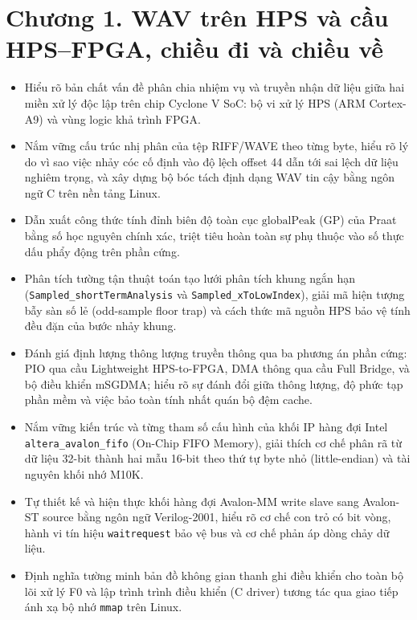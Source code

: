 \providecommand{\todo}[1]{\textcolor{red}{\textbf{[TODO: #1]}}}
\clearpage
{}
\section*{Chương 1. WAV trên HPS và cầu HPS–FPGA, chiều đi và chiều về}

\begin{learningobj}
\begin{itemize}[leftmargin=1.5em, itemsep=2pt]
    \item Hiểu rõ bản chất vấn đề phân chia nhiệm vụ và truyền nhận dữ liệu giữa hai miền xử lý độc lập trên chip Cyclone V SoC: bộ vi xử lý HPS (ARM Cortex-A9) và vùng logic khả trình FPGA.
    \item Nắm vững cấu trúc nhị phân của tệp RIFF/WAVE theo từng byte, hiểu rõ lý do vì sao việc nhảy cóc cố định vào độ lệch offset 44 dẫn tới sai lệch dữ liệu nghiêm trọng, và xây dựng bộ bóc tách định dạng WAV tin cậy bằng ngôn ngữ C trên nền tảng Linux.
    \item Dẫn xuất công thức tính đỉnh biên độ toàn cục $\text{globalPeak}$ (GP) của Praat bằng số học nguyên chính xác, triệt tiêu hoàn toàn sự phụ thuộc vào số thực dấu phẩy động trên phần cứng.
    \item Phân tích tường tận thuật toán tạo lưới phân tích khung ngắn hạn (\texttt{Sampled\_shortTermAnalysis} và \texttt{Sampled\_xToLowIndex}), giải mã hiện tượng bẫy sàn số lẻ (odd-sample floor trap) và cách thức mã nguồn HPS bảo vệ tính đều đặn của bước nhảy khung.
    \item Đánh giá định lượng thông lượng truyền thông qua ba phương án phần cứng: PIO qua cầu Lightweight HPS-to-FPGA, DMA thông qua cầu Full Bridge, và bộ điều khiển mSGDMA; hiểu rõ sự đánh đổi giữa thông lượng, độ phức tạp phần mềm và việc bảo toàn tính nhất quán bộ đệm cache.
    \item Nắm vững kiến trúc và từng tham số cấu hình của khối IP hàng đợi Intel \texttt{altera\_avalon\_fifo} (On-Chip FIFO Memory), giải thích cơ chế phân rã từ dữ liệu 32-bit thành hai mẫu 16-bit theo thứ tự byte nhỏ (little-endian) và tài nguyên khối nhớ M10K.
    \item Tự thiết kế và hiện thực khối hàng đợi Avalon-MM write slave sang Avalon-ST source bằng ngôn ngữ Verilog-2001, hiểu rõ cơ chế con trỏ có bit vòng, hành vi tín hiệu \texttt{waitrequest} bảo vệ bus và cơ chế phản áp dòng chảy dữ liệu.
    \item Định nghĩa tường minh bản đồ không gian thanh ghi điều khiển cho toàn bộ lõi xử lý F0 và lập trình trình điều khiển (C driver) tương tác qua giao tiếp ánh xạ bộ nhớ \texttt{mmap} trên Linux.
\end{itemize}
\end{learningobj}

